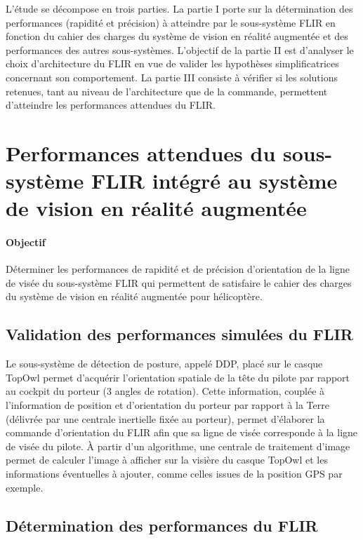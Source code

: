 L'étude se décompose en trois parties. La partie I porte sur la détermination des performances (rapidité et précision) à atteindre par le sous-système FLIR en fonction du cahier des charges du système de vision en réalité augmentée et des performances des autres sous-systèmes. L'objectif de la partie II est d'analyser le choix d'architecture du FLIR en vue de valider les hypothèses simplificatrices concernant son comportement. La partie III consiste à vérifier si les solutions retenues, tant au niveau de l'architecture que de la commande, permettent d'atteindre
les performances attendues du FLIR.

\section{Performances attendues du sous-système FLIR intégré au système de vision en réalité augmentée}

\paragraph{Objectif}

Déterminer les performances de rapidité et de précision d'orientation de la ligne de visée du sous-système FLIR qui permettent de satisfaire le cahier des charges du système de vision en réalité augmentée pour hélicoptère.

\subsection{Validation des performances simulées du FLIR}


Le sous-système de détection de posture, appelé DDP, placé sur le casque TopOwl permet d'acquérir l'orientation spatiale de la tête du pilote par rapport au cockpit du porteur (3 angles de rotation). Cette information, couplée à l'information de position et d'orientation du porteur par rapport à la Terre (délivrée par une centrale inertielle fixée au porteur), permet d'élaborer la commande d'orientation du FLIR afin que sa ligne de visée corresponde à la ligne de visée du pilote. À partir d'un algorithme, une centrale de traitement d'image permet de calculer l'image à afficher sur la visière du casque TopOwl et les informations éventuelles à ajouter, comme celles issues de la position GPS par exemple.

\subsection{Détermination des performances du FLIR}

